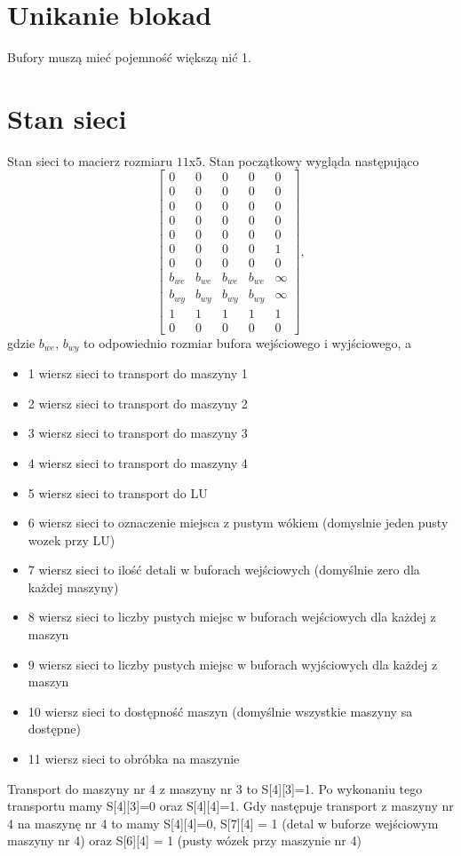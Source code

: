 \documentclass[10pt, a4paper]{article}
\begin{document}
\section{Unikanie blokad}
Bufory muszą mieć pojemność większą nić 1.


\section{Stan sieci}
Stan sieci to macierz rozmiaru $11$x$ 5$. Stan początkowy wygląda następująco
\begin{equation}
\left[\begin{array}{ccccc}
0 & 0 & 0 & 0&0\\
0 &0 &0 &0&0\\
0 &0 &0 &0&0\\
0 &0 &0 &0&0\\
0 &0 &0 &0&0\\
0 &0 &0 &0 &1\\
0 &0 &0 &0&0\\
b_{we}&b_{we}&b_{we}&b_{we} & \infty\\
b_{wy}&b_{wy}&b_{wy}&b_{wy} & \infty\\
1&1&1&1 &1\\
0 &0 &0 &0 &0
\end{array}\right],
\end{equation}
gdzie $b_{we}$, $b_{wy}$ to odpowiednio rozmiar bufora wejściowego i wyjściowego, a
\begin{itemize}
\item 1 wiersz sieci to transport do maszyny 1
\item 2 wiersz sieci to transport do maszyny 2
\item 3 wiersz sieci to transport do maszyny 3
\item 4 wiersz sieci to transport do maszyny 4
\item 5 wiersz sieci to transport do LU
\item 6 wiersz sieci to oznaczenie miejsca z pustym wókiem (domyslnie jeden pusty wozek przy LU)
\item 7 wiersz sieci to ilość detali w buforach wejściowych (domyślnie zero dla każdej maszyny)
\item 8 wiersz sieci to liczby pustych miejsc w buforach wejściowych dla każdej z maszyn
\item 9 wiersz sieci to liczby pustych miejsc w buforach wyjściowych dla każdej z maszyn
\item 10 wiersz sieci to dostępność maszyn (domyślnie wszystkie maszyny sa dostępne)
\item 11 wiersz sieci to obróbka na maszynie
\end{itemize}
Transport do maszyny nr 4 z maszyny nr 3 to S[4][3]=1. Po wykonaniu tego transportu mamy S[4][3]=0 oraz S[4][4]=1. Gdy następuje transport z maszyny nr 4 na maszynę nr 4 to mamy S[4][4]=0, S[7][4] = 1 (detal w buforze wejściowym maszyny nr 4) oraz S[6][4] = 1 (pusty wózek przy maszynie nr 4)
\end{document}
